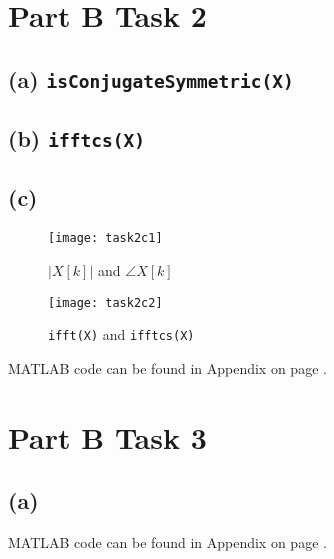 \documentclass{article}
\newenvironment{homeworkProblem}[1]{
	\section*{#1}
	}{
}
\newenvironment{homeworkSection}[1]{
	\subsection*{#1}
	}{
}
\begin{document}
\newpage
\begin{homeworkProblem}{Part B Task 2}


\begin{homeworkSection}{(a) \texttt{isConjugateSymmetric(X)}}



\end{homeworkSection}


\begin{homeworkSection}{(b) \texttt{ifftcs(X)}}

\label{ifftcs}

\end{homeworkSection}


\begin{homeworkSection}{(c)}

\begin{figure}[H]
\begin{minipage}[t]{0.5\linewidth}
\centering
\texttt{[image: task2c1]}
\caption{$|X[k]|$ and $\angle X[k]$}
\label{task2c1}
\end{minipage}
\begin{minipage}[t]{0.5\linewidth}
\centering
\texttt{[image: task2c2]}
\caption{\texttt{ifft(X)} and \texttt{ifftcs(X)}}
\label{task2c2}
\end{minipage}
\end{figure}

MATLAB code can be found in Appendix on page \pageref{task2c_code}.

\end{homeworkSection}


\end{homeworkProblem}


\begin{homeworkProblem}{Part B Task 3}


\begin{homeworkSection}{(a)}

MATLAB code can be found in Appendix on page \pageref{overlapaddreal}.

\end{homeworkSection}


\end{homeworkProblem}
\end{document}
